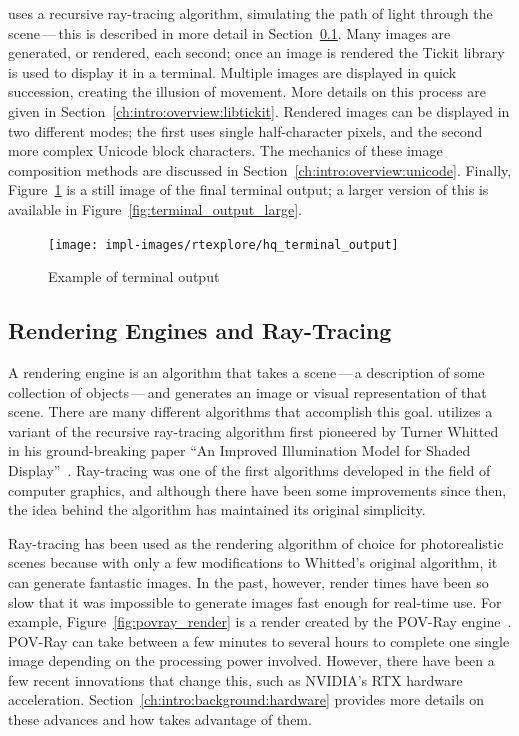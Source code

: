 \name{} uses a recursive ray-tracing algorithm, simulating the path of light through the scene\,---\,this is described in more detail in Section~\ref{ch:intro:overview:raytracing}.
Many images are generated, or rendered, each second; once an image is rendered the Tickit library~\cite{libtickitLibrary} is used to display it in a terminal.
Multiple images are displayed in quick succession, creating the illusion of movement.
More details on this process are given in Section~\ref{ch:intro:overview:libtickit}.
Rendered images can be displayed in two different modes; the first uses single half-character pixels, and the second more complex Unicode block characters.
The mechanics of these image composition methods are discussed in Section~\ref{ch:intro:overview:unicode}.
Finally, Figure~\ref{fig:terminal_output} is a still image of the final terminal output; a larger version of this is available in Figure~\ref{fig:terminal_output_large}.

\begin{figure}[htb]
  \centering
  \texttt{[image: impl-images/rtexplore/hq\_terminal\_output]}
  \caption{Example of terminal output}
\label{fig:terminal_output}
\end{figure}

\subsection{Rendering Engines and Ray-Tracing}
\label{ch:intro:overview:raytracing}

A rendering engine is an algorithm that takes a scene\,---\,a description of some collection of objects\,---\,and generates an image or visual representation of that scene.
There are many different algorithms that accomplish this goal.
\name{} utilizes a variant of the recursive ray-tracing algorithm first pioneered by Turner Whitted in his ground-breaking paper ``An Improved Illumination Model for Shaded Display''~\cite{whitted1980improved}.
Ray-tracing was one of the first algorithms developed in the field of computer graphics, and although there have been some improvements since then, the idea behind the algorithm has maintained its original simplicity.

Ray-tracing has been used as the rendering algorithm of choice for photorealistic scenes because with only a few modifications to Whitted's original algorithm, it can generate fantastic images.
In the past, however, render times have been so slow that it was impossible to generate images fast enough for real-time use.
For example, Figure~\ref{fig:povray_render} is a render created by the POV-Ray engine~\cite{povray}.
POV-Ray can take between a few minutes to several hours to complete one single image depending on the processing power involved.
However, there have been a few recent innovations that change this, such as NVIDIA's RTX hardware acceleration.
Section~\ref{ch:intro:background:hardware} provides more details on these advances and how \name{} takes advantage of them.

